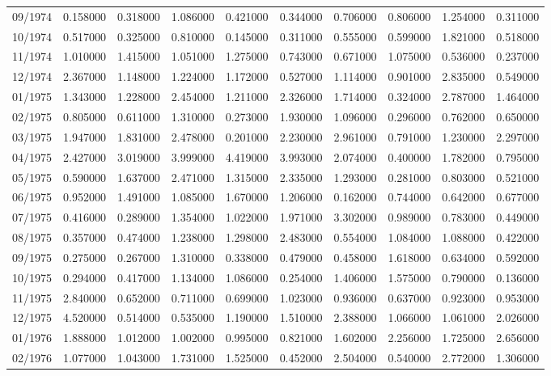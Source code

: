 \begin{tabular}{lrrrrrrrrr}
09/1974 & 0.158000 & 0.318000 & 1.086000 & 0.421000 & 0.344000 & 0.706000 & 0.806000 & 1.254000 & 0.311000 \\
10/1974 & 0.517000 & 0.325000 & 0.810000 & 0.145000 & 0.311000 & 0.555000 & 0.599000 & 1.821000 & 0.518000 \\
11/1974 & 1.010000 & 1.415000 & 1.051000 & 1.275000 & 0.743000 & 0.671000 & 1.075000 & 0.536000 & 0.237000 \\
12/1974 & 2.367000 & 1.148000 & 1.224000 & 1.172000 & 0.527000 & 1.114000 & 0.901000 & 2.835000 & 0.549000 \\
01/1975 & 1.343000 & 1.228000 & 2.454000 & 1.211000 & 2.326000 & 1.714000 & 0.324000 & 2.787000 & 1.464000 \\
02/1975 & 0.805000 & 0.611000 & 1.310000 & 0.273000 & 1.930000 & 1.096000 & 0.296000 & 0.762000 & 0.650000 \\
03/1975 & 1.947000 & 1.831000 & 2.478000 & 0.201000 & 2.230000 & 2.961000 & 0.791000 & 1.230000 & 2.297000 \\
04/1975 & 2.427000 & 3.019000 & 3.999000 & 4.419000 & 3.993000 & 2.074000 & 0.400000 & 1.782000 & 0.795000 \\
05/1975 & 0.590000 & 1.637000 & 2.471000 & 1.315000 & 2.335000 & 1.293000 & 0.281000 & 0.803000 & 0.521000 \\
06/1975 & 0.952000 & 1.491000 & 1.085000 & 1.670000 & 1.206000 & 0.162000 & 0.744000 & 0.642000 & 0.677000 \\
07/1975 & 0.416000 & 0.289000 & 1.354000 & 1.022000 & 1.971000 & 3.302000 & 0.989000 & 0.783000 & 0.449000 \\
08/1975 & 0.357000 & 0.474000 & 1.238000 & 1.298000 & 2.483000 & 0.554000 & 1.084000 & 1.088000 & 0.422000 \\
09/1975 & 0.275000 & 0.267000 & 1.310000 & 0.338000 & 0.479000 & 0.458000 & 1.618000 & 0.634000 & 0.592000 \\
10/1975 & 0.294000 & 0.417000 & 1.134000 & 1.086000 & 0.254000 & 1.406000 & 1.575000 & 0.790000 & 0.136000 \\
11/1975 & 2.840000 & 0.652000 & 0.711000 & 0.699000 & 1.023000 & 0.936000 & 0.637000 & 0.923000 & 0.953000 \\
12/1975 & 4.520000 & 0.514000 & 0.535000 & 1.190000 & 1.510000 & 2.388000 & 1.066000 & 1.061000 & 2.026000 \\
01/1976 & 1.888000 & 1.012000 & 1.002000 & 0.995000 & 0.821000 & 1.602000 & 2.256000 & 1.725000 & 2.656000 \\
02/1976 & 1.077000 & 1.043000 & 1.731000 & 1.525000 & 0.452000 & 2.504000 & 0.540000 & 2.772000 & 1.306000 \\

\end{tabular}
